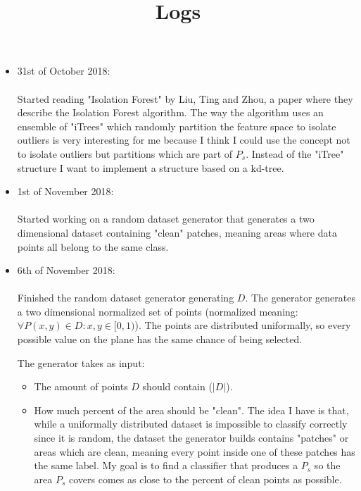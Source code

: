 \documentclass[12pt]{article}
\title{Logs}
\date{}
\begin{document}
\maketitle

\begin{itemize}

  \item 31st of October 2018: \\ \\
    Started reading "Isolation Forest" by Liu, Ting and
    Zhou, a paper where they describe the Isolation Forest
    algorithm. The way the algorithm uses an ensemble of
    "iTrees" which randomly partition the feature space
    to isolate outliers is very interesting for me because
    I think I could use the concept not to isolate outliers
    but partitions which are part of $P_s$.\cite{if}
    Instead of the "iTree" structure I want to implement a
    structure based on a kd-tree.

  \item 1st of November 2018: \\ \\
    Started working on a random dataset generator that
    generates a two dimensional dataset containing
    "clean" patches, meaning areas where data points all
    belong to the same class.

  \item 6th of November 2018: \\ \\
    Finished the random dataset generator generating $D$.
    The generator generates a two dimensional normalized
    set of points (normalized meaning:
    $\forall P(x,y) \in D: x, y \in [0,1)$). The points are
    distributed uniformally, so every possible value on the
    plane has the same chance of being selected.

    The generator takes as input:
      \begin{itemize}

        \item The amount of points $D$ should contain
              ($|D|$).

        \item How much percent of the area should be
              "clean". The idea I have is that, while a
              uniformally distributed dataset is impossible
              to classify correctly since it is random, the
              dataset the generator builds contains
              "patches" or areas which are clean, meaning
              every point inside one of these patches has
              the same label. My goal is to find a
              classifier that produces a $P_s$ so the area
              $P_s$ covers comes as close to the percent of
              clean points as possible.


\end{itemize}
\end{itemize}
\end{document}
